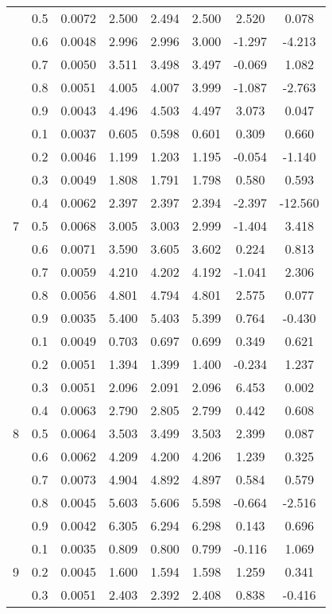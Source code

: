 \documentclass[11pt,a4paper]{report}
\begin{document}
\begin{longtable}{ | c | c || c | c | c | c | c | c | }
 & 0.5 & 0.0072 & 2.500 & 2.494 & 2.500 & 2.520 & 0.078 \\
 & 0.6 & 0.0048 & 2.996 & 2.996 & 3.000 & -1.297 & -4.213 \\
 & 0.7 & 0.0050 & 3.511 & 3.498 & 3.497 & -0.069 & 1.082 \\
 & 0.8 & 0.0051 & 4.005 & 4.007 & 3.999 & -1.087 & -2.763 \\
 & 0.9 & 0.0043 & 4.496 & 4.503 & 4.497 & 3.073 & 0.047 \\
 \hline
\multirow{9}{*}{7} & 0.1 & 0.0037 & 0.605 & 0.598 & 0.601 & 0.309 & 0.660 \\
 & 0.2 & 0.0046 & 1.199 & 1.203 & 1.195 & -0.054 & -1.140 \\
 & 0.3 & 0.0049 & 1.808 & 1.791 & 1.798 & 0.580 & 0.593 \\
 & 0.4 & 0.0062 & 2.397 & 2.397 & 2.394 & -2.397 & -12.560 \\
 & 0.5 & 0.0068 & 3.005 & 3.003 & 2.999 & -1.404 & 3.418 \\
 & 0.6 & 0.0071 & 3.590 & 3.605 & 3.602 & 0.224 & 0.813 \\
 & 0.7 & 0.0059 & 4.210 & 4.202 & 4.192 & -1.041 & 2.306 \\
 & 0.8 & 0.0056 & 4.801 & 4.794 & 4.801 & 2.575 & 0.077 \\
 & 0.9 & 0.0035 & 5.400 & 5.403 & 5.399 & 0.764 & -0.430 \\
 \hline
\multirow{9}{*}{8} & 0.1 & 0.0049 & 0.703 & 0.697 & 0.699 & 0.349 & 0.621 \\
 & 0.2 & 0.0051 & 1.394 & 1.399 & 1.400 & -0.234 & 1.237 \\
 & 0.3 & 0.0051 & 2.096 & 2.091 & 2.096 & 6.453 & 0.002 \\
 & 0.4 & 0.0063 & 2.790 & 2.805 & 2.799 & 0.442 & 0.608 \\
 & 0.5 & 0.0064 & 3.503 & 3.499 & 3.503 & 2.399 & 0.087 \\
 & 0.6 & 0.0062 & 4.209 & 4.200 & 4.206 & 1.239 & 0.325 \\
 & 0.7 & 0.0073 & 4.904 & 4.892 & 4.897 & 0.584 & 0.579 \\
 & 0.8 & 0.0045 & 5.603 & 5.606 & 5.598 & -0.664 & -2.516 \\
 & 0.9 & 0.0042 & 6.305 & 6.294 & 6.298 & 0.143 & 0.696 \\
 \hline
\multirow{9}{*}{9} & 0.1 & 0.0035 & 0.809 & 0.800 & 0.799 & -0.116 & 1.069 \\
 & 0.2 & 0.0045 & 1.600 & 1.594 & 1.598 & 1.259 & 0.341 \\
 & 0.3 & 0.0051 & 2.403 & 2.392 & 2.408 & 0.838 & -0.416 \\

\end{longtable}
\end{document}
